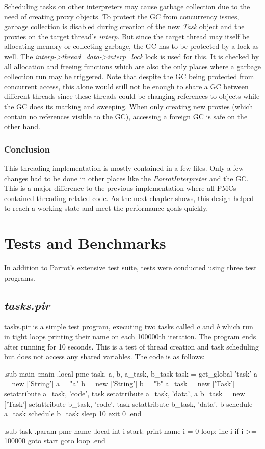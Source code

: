 \documentclass[bachelor,english]{hgbthesis}
\begin{document}
Scheduling tasks on other interpreters may cause garbage collection due to the need of creating proxy objects. To protect the GC from concurrency issues, garbage collection is disabled during creation of the new \textit{Task} object and the proxies on the target thread's \textit{interp}. But since the target thread may itself be allocating memory or collecting garbage, the GC has to be protected by a lock as well. The \textit{interp->thread\_data->interp\_lock} lock is used for this. It is checked by all allocation and freeing functions which are also the only places where a garbage collection run may be triggered. Note that despite the GC being protected from concurrent access, this alone would still not be enough to share a GC between different threads since these threads could be changing references to objects while the GC does its marking and sweeping. When only creating new proxies (which contain no references visible to the GC), accessing a foreign GC is safe on the other hand.

\subsection{Conclusion}

This threading implementation is mostly contained in a few files. Only a few changes had to be done in other places like the \textit{ParrotInterpreter} and the GC. This is a major difference to the previous implementation where all PMCs contained threading related code. As the next chapter shows, this design helped to reach a working state and meet the performance goals quickly.

\chapter{Tests and Benchmarks}

In addition to Parrot's extensive test suite, tests were conducted using three test programs.

\section{\textit{tasks.pir}}

tasks.pir is a simple test program, executing two tasks called \textit{a} and \textit{b} which run in tight loops printing their name on each 100000th iteration. The program ends after running for 10 seconds. This is a test of thread creation and task scheduling but does not access any shared variables. The code is as follows:
%
\begin{GenericCode}
.sub main :main
    .local pmc task, a, b, a_task, b_task
    task = get_global 'task'
    a = new ['String']
    a = "a"
    b = new ['String']
    b = "b"
    a_task = new ['Task']
    setattribute a_task, 'code', task
    setattribute a_task, 'data', a
    b_task = new ['Task']
    setattribute b_task, 'code', task
    setattribute b_task, 'data', b
    schedule a_task
    schedule b_task
    sleep 10
    exit 0
.end

.sub task
    .param pmc name
    .local int i
start:
    print name
    i = 0
loop:
    inc i
    if i >= 100000 goto start
    goto loop
.end
\end{GenericCode}
\end{document}
